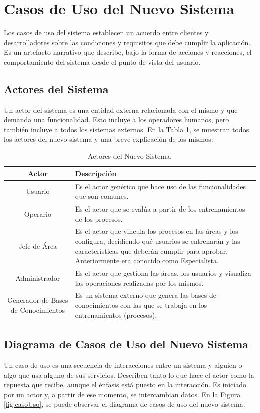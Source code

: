 \section{Casos de Uso del Nuevo Sistema}
Los casos de uso del sistema establecen un acuerdo entre clientes y desarrolladores sobre las condiciones y requisitos que debe cumplir la aplicación. Es un artefacto narrativo que describe, bajo la forma de acciones y reacciones, el comportamiento del sistema desde el punto de vista del usuario.

\subsection{Actores del Sistema} 
Un actor del sistema es una entidad externa relacionada con el mismo y que demanda una funcionalidad. Esto incluye a los operadores humanos, pero también incluye a todos los sistemas externos. En la Tabla \ref{tab:actores}, se muestran todos los actores del nuevo sistema y una breve explicación de los mismos:

\begin{table}[h]
\begin{center}
\begin{tabular}{ | c | p{7.8cm} | }
\hline
\textbf{Actor} & \textbf{Descripción} \\
\hline
Usuario & Es el actor genérico que hace uso de las funcionalidades que son comunes. \\
\hline
Operario & Es el actor que se evalúa a partir de los entrenamientos de los procesos. \\
\hline
Jefe de Área & Es el actor que vincula los procesos en las áreas y los configura, decidiendo qué usuarios se entrenarán y las características que deberán cumplir para aprobar. Anteriormente era conocido como Especialista. \\
\hline
Administrador & Es el actor que gestiona las áreas, los usuarios y visualiza las operaciones realizadas por los mismos. \\
\hline
Generador de Bases de Conocimientos & Es un sistema externo que genera las bases de conocimientos con las que se trabaja en los entrenamientos (procesos). \\
\hline
\end{tabular}
\caption{Actores del Nuevo Sistema.}
\label{tab:actores}
\end{center}
\end{table}

\subsection{Diagrama de Casos de Uso del Nuevo Sistema}
Un caso de uso es una secuencia de interacciones entre un sistema y alguien o algo que usa alguno de sus servicios. Describen tanto lo que hace el actor como la repuesta que recibe, aunque el énfasis está puesto en la interacción. Es iniciado por un actor y, a partir de ese momento, se intercambian datos. En la Figura \ref{fig:casoUso}, se puede observar el diagrama de casos de uso del nuevo sistema.

